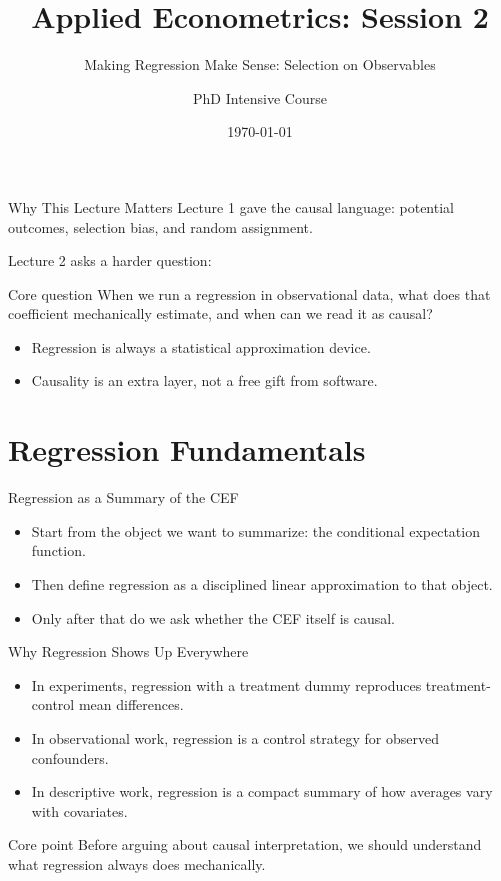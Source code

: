 \documentclass[11pt,aspectratio=169]{beamer}
\title{Applied Econometrics: Session 2}
\subtitle{Making Regression Make Sense: Selection on Observables}
\author{PhD Intensive Course}
\institute{Lecture 2}
\date{\today}
\begin{document}
\begin{frame}
  \titlepage
\end{frame}



\begin{frame}{Why This Lecture Matters}
  Lecture 1 gave the causal language: potential outcomes, selection bias, and random assignment.
  \vspace{0.4em}

  Lecture 2 asks a harder question:
  \begin{block}{Core question}
    When we run a regression in observational data, what does that coefficient mechanically estimate, and when can we read it as causal?
  \end{block}

  \begin{itemize}
    \item Regression is always a statistical approximation device.
    \item Causality is an extra layer, not a free gift from software.
  \end{itemize}
\end{frame}

\section{Regression Fundamentals}

\begin{frame}{Regression as a Summary of the CEF}
  \begin{itemize}
    \item Start from the object we want to summarize: the conditional expectation function.
    \item Then define regression as a disciplined linear approximation to that object.
    \item Only after that do we ask whether the CEF itself is causal.
  \end{itemize}
\end{frame}

\begin{frame}{Why Regression Shows Up Everywhere}
  \begin{itemize}
    \item In experiments, regression with a treatment dummy reproduces treatment-control mean differences.
    \item In observational work, regression is a control strategy for observed confounders.
    \item In descriptive work, regression is a compact summary of how averages vary with covariates.
  \end{itemize}
  \begin{block}{Core point}
    Before arguing about causal interpretation, we should understand what regression always does mechanically.
  \end{block}
\end{frame}
\end{document}

